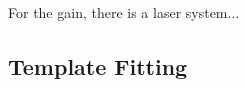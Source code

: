 For the gain, there is a laser system...









\cite{Kaspar:2016ofv}



\subsection{Template Fitting}
\label{sec:TemplateFitting}


